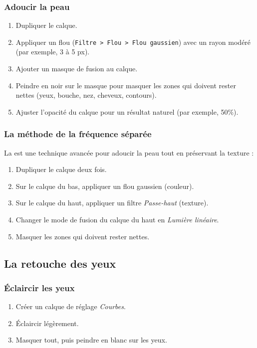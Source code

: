 \subsubsection{Adoucir la peau}

\begin{enumerate}
    \item Dupliquer le calque.
    \item Appliquer un flou (\texttt{Filtre > Flou > Flou gaussien}) avec un rayon modéré (par exemple, 3 à 5 px).
    \item Ajouter un masque de fusion au calque.
    \item Peindre en noir sur le masque pour masquer les zones qui doivent rester nettes (yeux, bouche, nez, cheveux, contours).
    \item Ajuster l'opacité du calque pour un résultat naturel (par exemple, 50\%).
\end{enumerate}

\subsubsection{La méthode de la fréquence séparée}

La  est une technique avancée pour adoucir la peau tout en préservant la texture :

\begin{enumerate}
    \item Dupliquer le calque deux fois.
    \item Sur le calque du bas, appliquer un flou gaussien (couleur).
    \item Sur le calque du haut, appliquer un filtre \emph{Passe-haut} (texture).
    \item Changer le mode de fusion du calque du haut en \emph{Lumière linéaire}.
    \item Masquer les zones qui doivent rester nettes.
\end{enumerate}

\subsection{La retouche des yeux}

\subsubsection{Éclaircir les yeux}

\begin{enumerate}
    \item Créer un calque de réglage \emph{Courbes}.
    \item Éclaircir légèrement.
    \item Masquer tout, puis peindre en blanc sur les yeux.
\end{enumerate}

